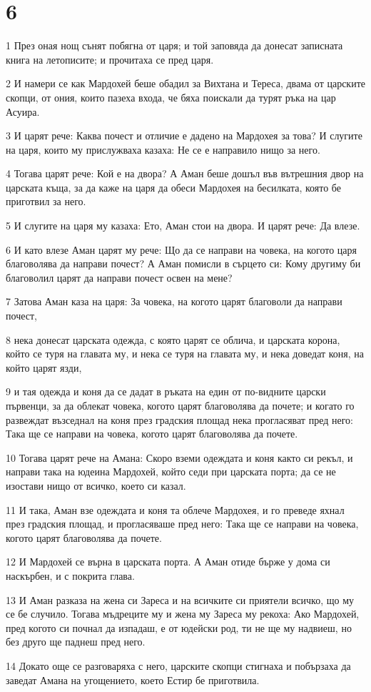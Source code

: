 \chapter{6}

\par 1 През оная нощ сънят побягна от царя; и той заповяда да донесат записната книга на летописите; и прочитаха се пред царя.
\par 2 И намери се как Мардохей беше обадил за Вихтана и Тереса, двама от царските скопци, от ония, които пазеха входа, че бяха поискали да турят ръка на цар Асуира.
\par 3 И царят рече: Каква почест и отличие е дадено на Мардохея за това? И слугите на царя, които му прислужваха казаха: Не се е направило нищо за него.
\par 4 Тогава царят рече: Кой е на двора? А Аман беше дошъл във вътрешния двор на царската къща, за да каже на царя да обеси Мардохея на бесилката, която бе приготвил за него.
\par 5 И слугите на царя му казаха: Ето, Аман стои на двора. И царят рече: Да влезе.
\par 6 И като влезе Аман царят му рече: Що да се направи на човека, на когото царя благоволява да направи почест? А Аман помисли в сърцето си: Кому другиму би благоволил царят да направи почест освен на мене?
\par 7 Затова Аман каза на царя: За човека, на когото царят благоволи да направи почест,
\par 8 нека донесат царската одежда, с която царят се облича, и царската корона, който се туря на главата му, и нека се туря на главата му, и нека доведат коня, на който царят язди,
\par 9 и тая одежда и коня да се дадат в ръката на един от по-видните царски първенци, за да облекат човека, когото царят благоволява да почете; и когато го развеждат възседнал на коня през градския площад нека прогласяват пред него: Така ще се направи на човека, когото царят благоволява да почете.
\par 10 Тогава царят рече на Амана: Скоро вземи одеждата и коня както си рекъл, и направи така на юдеина Мардохей, който седи при царската порта; да се не изостави нищо от всичко, което си казал.
\par 11 И така, Аман взе одеждата и коня та облече Мардохея, и го преведе яхнал през градския площад, и прогласяваше пред него: Така ще се направи на човека, когото царят благоволява да почете.
\par 12 И Мардохей се върна в царската порта. А Аман отиде бърже у дома си наскърбен, и с покрита глава.
\par 13 И Аман разказа на жена си Зареса и на всичките си приятели всичко, що му се бе случило. Тогава мъдреците му и жена му Зареса му рекоха: Ако Мардохей, пред когото си почнал да изпадаш, е от юдейски род, ти не ще му надвиеш, но без друго ще паднеш пред него.
\par 14 Докато още се разговаряха с него, царските скопци стигнаха и побързаха да заведат Амана на угощението, което Естир бе приготвила.


